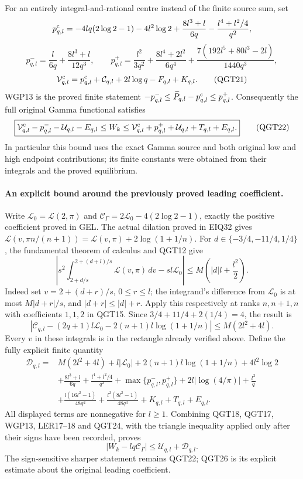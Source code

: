 For an entirely integral-and-rational centre instead of the finite
source sum, set
\[
 p^{\rm c}_{q,l}=-4lq(2\log2-1)-4l^2\log2
       +\frac{8l^3+l}{6q}-\frac{l^4+l^2/4}{q^2},
\]
\[
 p^-_{q,l}=\frac l{6q}+\frac{8l^3+l}{12q^3},\qquad
 p^+_{q,l}=\frac{l^2}{3q^2}
       +\frac{8l^4+2l^2}{6q^4}
       +\frac{7(192l^5+80l^3-2l)}{1440q^3},
\]
\[
 \mathcal V^{\rm c}_{q,l}
     =p^{\rm c}_{q,l}+\mathcal C_{q,l}
                        +2l\log q-F_{q,l}+K_{q,l}.
 \tag{QGT21}
\]
WGP13 is the proved finite statement
$-p^-_{q,l}\le\widetilde P_{q,l}-p^{\rm c}_{q,l}\le p^+_{q,l}$.
Consequently the full original Gamma functional satisfies
\[
 \boxed{\mathcal V^{\rm c}_{q,l}-p^-_{q,l}-\mathcal U_{q,l}-E_{q,l}
       \le W_k\le
       \mathcal V^{\rm c}_{q,l}+p^+_{q,l}
                         +\mathcal U_{q,l}+T_{q,l}+E_{q,l}.}
 \tag{QGT22}
\]
In particular this bound uses the exact Gamma source and both original
low and high endpoint contributions; its finite constants were
obtained from their integrals and the proved equilibrium.

\paragraph{An explicit bound around the previously proved leading coefficient.}
Write $\mathcal L_0=\mathcal L(2,\pi)$ and
$\mathcal C_\Gamma=2\mathcal L_0-4(2\log2-1)$, exactly the positive
coefficient proved in GEL. The actual dilation proved in EIQ32 gives
$\mathcal L(v,\pi n/(n+1))=
\mathcal L(v,\pi)+2\log(1+1/n)$.
For $d\in\{-3/4,-11/4,1/4\}$, the fundamental theorem of calculus
and QGT12 give
\[
 \left|s^2\int_{2+d/s}^{2+(d+l)/s}
           \mathcal L(v,\pi)\,dv-sl\mathcal L_0\right|
 \le M\left(|d|l+\frac{l^2}{2}\right).
 \tag{QGT23}
\]
Indeed set $v=2+(d+r)/s$, $0\le r\le l$; the integrand's
difference from $\mathcal L_0$ is at most $M|d+r|/s$,
and $|d+r|\le |d|+r$. Apply this respectively at ranks $n,n+1,n$
with coefficients $1,1,2$ in QGT15. Since
$3/4+11/4+2(1/4)=4$, the result is
\[
 \left|\mathcal C_{q,l}-(2q+1)l\mathcal L_0
                      -2(n+1)l\log(1+1/n)\right|
                    \le M(2l^2+4l).
 \tag{QGT24}
\]
Every $v$ in these integrals is in the rectangle already verified above.
Define the fully explicit finite quantity
\[
\begin{split}
 \mathcal D_{q,l}={}&M(2l^2+4l)+l|\mathcal L_0|
        +2(n+1)l\log(1+1/n)+4l^2\log2\\
 &+\frac{8l^3+l}{6q}+\frac{l^4+l^2/4}{q^2}
        +\max\{p^-_{q,l},p^+_{q,l}\}
        +2l|\log(4/\pi)|+\frac{l^2}{q}\\
 &+\frac{l(16l^2-1)}{48q^2}
        +\frac{l^2(8l^2-1)}{48q^3}
        +K_{q,l}+T_{q,l}+E_{q,l}.
\end{split}
 \tag{QGT25}
\]
All displayed terms are nonnegative for $l\ge1$. Combining
QGT18, QGT17, WGP13, LER17--18 and QGT24, with the triangle inequality
applied only after their signs have been recorded, proves
\[
 \boxed{|W_k-lq\mathcal C_\Gamma|
                     \le\mathcal U_{q,l}+\mathcal D_{q,l}.}
 \tag{QGT26}
\]
The sign-sensitive sharper statement remains QGT22; QGT26 is its
explicit estimate about the original leading coefficient.

